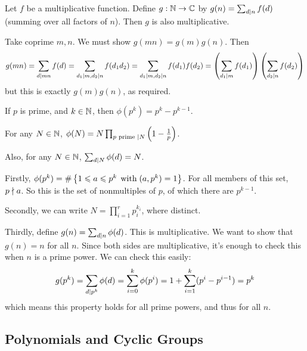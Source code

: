 \documentclass{article}
\begin{document}
\begin{proposition}
	Let $f$ be a multiplicative function.
	Define $g: \mathbb{N} \to \mathbb{C}$ by $g(n) = \sum_{d \mid n} f(d)$ (summing over all factors of $n$).
	Then $g$ is also multiplicative. 
\end{proposition}

\begin{prf}
	Take coprime $m, n$. We must show $g(mn) = g(m) g(n)$. Then
	\[
	g(mn) = \sum_{d \mid mn} f(d) = \sum_{d_1 \mid m, d_2 \mid n} f(d_1 d_2) = \sum_{d_1 \mid m, d_2 \mid n} f(d_1) f(d_2) = \left( \sum_{d_1 \mid m} f(d_1) \right) \left( \sum_{d_2 \mid n} f(d_2) \right)
	\]
	but this is exactly $g(m)g(n)$, as required.
\end{prf}
	
\begin{proposition}
	If $p$ is prime, and $k \in \mathbb{N}$, then $\phi(p^k) = p^k - p^{k-1}$.
	
	For any $N \in \mathbb{N}$, $\phi(N) = N \prod_{p \text{ prime } \mid N} \left( 1 - \frac{1}{p}\right)$.
	
	Also, for any $N \in \mathbb{N}$, $\sum_{d \mid N} \phi(d) = N$.
\end{proposition}

\begin{prf}
	Firstly, $\phi(p^k) = \# \left\lbrace 1 \leqslant a \leqslant p^k \mathrel{\, \text{with}} (a, p^k) = 1 \right\rbrace$. For all members of this set, $p \nmid a$. So this is the set of nonmultiples of $p$, of which there are $p^{k-1}$.
	
	Secondly, we can write $N = \prod_{i = 1}^r p_i^{k_i}$, where distinct.
	
	Thirdly, define $g(n) = \sum_{d \mid n} \phi(d)$. This is multiplicative. We want to show that $g(n) = n$ for all $n$. Since both sides are multiplicative, it's enough to check this when $n$ is a prime power. We can check this easily:
	\[
	g(p^k) = \sum_{d \mid p^k} \phi(d) = \sum_{i=0}^k \phi(p^i) = 1 + \sum_{i=1}^k (p^i - p^{i-1}) = p^k
	\]
	which means this property holds for all prime powers, and thus for all $n$.
\end{prf}


\subsection{Polynomials and Cyclic Groups}
\label{subsection-intro-polynomials-cyclic-groups}
\end{document}
